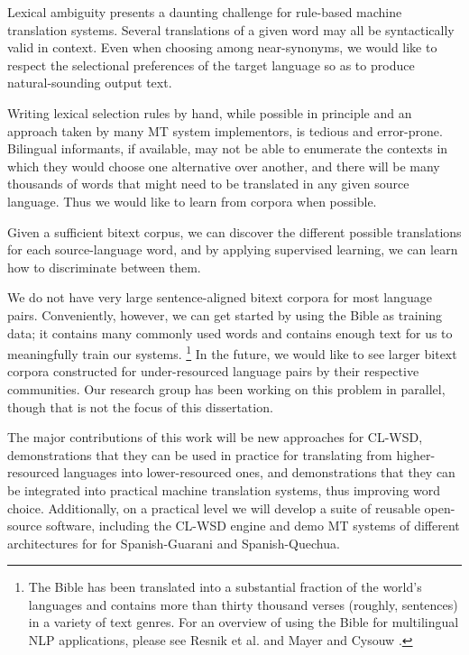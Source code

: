 Lexical ambiguity presents a daunting challenge for rule-based machine
translation systems. Several translations of a given word may all be
syntactically valid in context.
Even when choosing among near-synonyms, we would like to respect the
selectional preferences of the target language so as to produce
natural-sounding output text.

Writing lexical selection rules by hand, while possible in principle and an
approach taken by many MT system implementors, is tedious and error-prone.
Bilingual informants, if available, may not be able to enumerate the contexts
in which they would choose one alternative over another, and there will be many
thousands of words that might need to be translated in any given source
language. Thus we would like to learn from corpora when possible.

Given a sufficient bitext corpus, we can discover the different possible
translations for each source-language word, and by applying supervised
learning, we can learn how to discriminate between them.

We do not have very large sentence-aligned bitext corpora for most language
pairs. Conveniently, however, we can get started by using the Bible as training
data; it contains many commonly used words and contains enough text for us to
meaningfully train our systems. \footnote{The
Bible has been translated into a substantial fraction of the world's languages
and contains more than thirty thousand verses (roughly, sentences) in
a variety of text genres. For an overview of using the Bible for multilingual
NLP applications, please see Resnik et al.
\cite{DBLP:journals/lre/ResnikOD99} and Mayer and Cysouw
\cite{MAYER14.220.L14-1215}.} In the future, we would like to see larger
bitext corpora constructed for under-resourced language pairs by their
respective communities. Our research group has been working on this problem in
parallel, though that is not the focus of this dissertation.

The major contributions of this work will be new approaches for CL-WSD,
demonstrations that they can be used in practice for translating from
higher-resourced languages into lower-resourced ones, and demonstrations that
they can be integrated into practical machine translation systems, thus
improving word choice.
Additionally, on a practical level we will develop a suite of reusable 
open-source software, including the CL-WSD engine and demo MT systems of
different architectures for for Spanish-Guarani and Spanish-Quechua.

